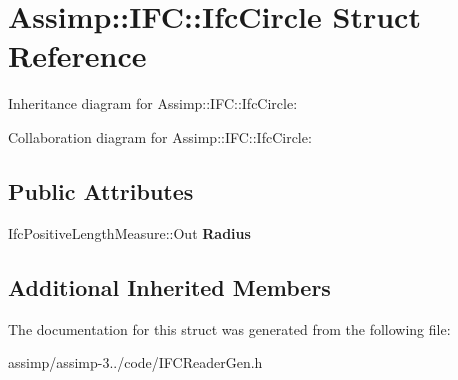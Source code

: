 \hypertarget{struct_assimp_1_1_i_f_c_1_1_ifc_circle}{\section{Assimp\+:\+:I\+F\+C\+:\+:Ifc\+Circle Struct Reference}
\label{struct_assimp_1_1_i_f_c_1_1_ifc_circle}
}


Inheritance diagram for Assimp\+:\+:I\+F\+C\+:\+:Ifc\+Circle\+:


Collaboration diagram for Assimp\+:\+:I\+F\+C\+:\+:Ifc\+Circle\+:
\subsection*{Public Attributes}
\begin{DoxyCompactItemize}
\item 
\hypertarget{struct_assimp_1_1_i_f_c_1_1_ifc_circle_abd4ab62efa2a4f56f85513c4d0ba73eb}{Ifc\+Positive\+Length\+Measure\+::\+Out {\bfseries Radius}}\label{struct_assimp_1_1_i_f_c_1_1_ifc_circle_abd4ab62efa2a4f56f85513c4d0ba73eb}

\end{DoxyCompactItemize}
\subsection*{Additional Inherited Members}


The documentation for this struct was generated from the following file\+:\begin{DoxyCompactItemize}
\item 
assimp/assimp-\/3../code/I\+F\+C\+Reader\+Gen.\+h\end{DoxyCompactItemize}
